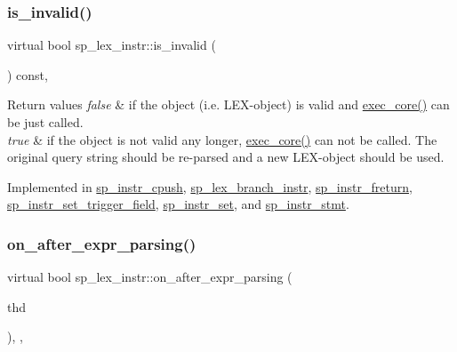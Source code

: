 \subsubsection{\texorpdfstring{is\+\_\+invalid()}{is\_invalid()}}
{\footnotesize\ttfamily virtual bool sp\+\_\+lex\+\_\+instr\+::is\+\_\+invalid (\begin{DoxyParamCaption}{ }\end{DoxyParamCaption}) const\hspace{0.3cm}{\ttfamily [protected]}, {}}


\begin{DoxyRetVals}{Return values}
{\em false} & if the object (i.\+e. L\+EX-\/object) is valid and \mbox{\hyperlink{classsp__lex__instr_acab4e56f638f43101c11f838e1f9d395}{exec\+\_\+core()}} can be just called.\\
\hline
{\em true} & if the object is not valid any longer, \mbox{\hyperlink{classsp__lex__instr_acab4e56f638f43101c11f838e1f9d395}{exec\+\_\+core()}} can not be called. The original query string should be re-\/parsed and a new L\+EX-\/object should be used. \\
\hline
\end{DoxyRetVals}


Implemented in \mbox{\hyperlink{classsp__instr__cpush_a05c39644e6c5fd40fd72123b9d7d025d}{sp\+\_\+instr\+\_\+cpush}}, \mbox{\hyperlink{classsp__lex__branch__instr_a22c35f1cd8a840a61e4881903ad6ff03}{sp\+\_\+lex\+\_\+branch\+\_\+instr}}, \mbox{\hyperlink{classsp__instr__freturn_aefb864f222cf52f923cf0ba0ce67943b}{sp\+\_\+instr\+\_\+freturn}}, \mbox{\hyperlink{classsp__instr__set__trigger__field_a8bb1d26a072313c690d91bc973d63276}{sp\+\_\+instr\+\_\+set\+\_\+trigger\+\_\+field}}, \mbox{\hyperlink{classsp__instr__set_af9865816c222a82cb3bad59b428ddf77}{sp\+\_\+instr\+\_\+set}}, and \mbox{\hyperlink{classsp__instr__stmt_aeadeb9c91a52db353dceab5586ed511e}{sp\+\_\+instr\+\_\+stmt}}.

\mbox{\label{classsp__lex__instr_adcace7d5b7daeb393d0592592a2d9d6c}} 
\subsubsection{\texorpdfstring{on\+\_\+after\+\_\+expr\+\_\+parsing()}{on\_after\_expr\_parsing()}}
{\footnotesize\ttfamily virtual bool sp\+\_\+lex\+\_\+instr\+::on\+\_\+after\+\_\+expr\+\_\+parsing (\begin{DoxyParamCaption}\item[{T\+HD $\ast$}]{thd }\end{DoxyParamCaption})\hspace{0.3cm}{\ttfamily [inline]}, {\ttfamily [protected]}, {\ttfamily [virtual]}}

